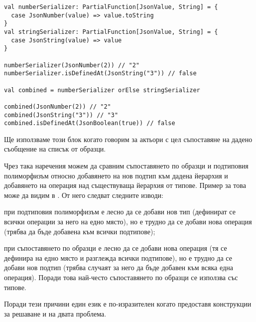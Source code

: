 \begin{lstlisting}
val numberSerializer: PartialFunction[JsonValue, String] = {
  case JsonNumber(value) => value.toString
}
val stringSerializer: PartialFunction[JsonValue, String] = {
  case JsonString(value) => value
}

numberSerializer(JsonNumber(2)) // "2"
numberSerializer.isDefinedAt(JsonString("3")) // false

val combined = numberSerializer orElse stringSerializer

combined(JsonNumber(2)) // "2"
combined(JsonString("3")) // "3"
combined.isDefinedAt(JsonBoolean(true)) // false
\end{lstlisting}

Ще използваме този блок когато говорим за актьори с цел съпоставяне на дадено съобщение на списък от образци.

Чрез така наречения  \cite{wadler1998TheExpressionProblem} можем да сравним съпоставянето по образци и подтиповия полиморфизъм относно добавянето на нов подтип към дадена йерархия и добавянето на операция над съществуваща йерархия от типове. Пример за това може да видим в . От него следват следните изводи:

\begin{itemize*}
  \item при подтиповия полиморфизъм е лесно да се добави нов тип (дефинират се всички операции за него на едно място), но е трудно да се добави нова операция (трябва да бъде добавена към всички подтипове);
  \item при съпоставянето по образци е лесно да се добави нова операция (тя се дефинира на едно място и разглежда всички подтипове), но е трудно да се добави нов подтип (трябва случаят за него да бъде добавен към всяка една операция). Поради това най-често съпоставянето по образци се използва със  типове.
\end{itemize*}

Поради тези причини един език е по-изразителен когато предоставя конструкции за решаване и на двата проблема.
